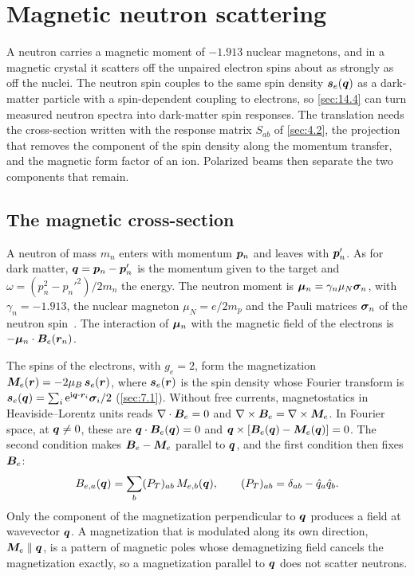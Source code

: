 \section{Magnetic neutron scattering}\label{app:C.19}

A neutron carries a magnetic moment of $-1.913$ nuclear magnetons, and in a magnetic crystal it scatters off the unpaired electron spins about as strongly as off the nuclei. The neutron spin couples to the same spin density $\bm{s}_e(\bm{q})$ as a dark-matter particle with a spin-dependent coupling to electrons, so \cref{sec:14.4} can turn measured neutron spectra into dark-matter spin responses. The translation needs the cross-section written with the response matrix $S_{ab}$ of \cref{sec:4.2}, the projection that removes the component of the spin density along the momentum transfer, and the magnetic form factor of an ion. Polarized beams then separate the two components that remain.

\subsection{The magnetic cross-section}

A neutron of mass $m_n$ enters with momentum $\bm{p}_n$ and leaves with $\bm{p}'_n$. As for dark matter, $\bm{q} = \bm{p}_n - \bm{p}'_n$ is the momentum given to the target and $\omega = (p_n^2 - p_n'^2)/2m_n$ the energy. The neutron moment is $\bm{\mu}_n = \gamma_n\mu_N\bm{\sigma}_n$, with $\gamma_n = -1.913$, the nuclear magneton $\mu_N = e/2m_p$ and the Pauli matrices $\bm{\sigma}_n$ of the neutron spin~\cite[Chap.~7]{squires2012introduction}. The interaction of $\bm{\mu}_n$ with the magnetic field of the electrons is $-\bm{\mu}_n\cdot\bm{B}_e(\bm{r}_n)$.

The spins of the electrons, with $g_e = 2$, form the magnetization $\bm{M}_e(\bm{r}) = -2\mu_B\,\bm{s}_e(\bm{r})$, where $\bm{s}_e(\bm{r})$ is the spin density whose Fourier transform is $\bm{s}_e(\bm{q}) = \sum_i\mathrm{e}^{\mathrm{i}\bm{q}\cdot\bm{r}_i}\bm{\sigma}_i/2$ (\cref{sec:7.1}). Without free currents, magnetostatics in Heaviside--Lorentz units reads $\nabla\cdot\bm{B}_e = 0$ and $\nabla\times\bm{B}_e = \nabla\times\bm{M}_e$. In Fourier space, at $\bm{q} \neq 0$, these are $\bm{q}\cdot\bm{B}_e(\bm{q}) = 0$ and $\bm{q}\times[\bm{B}_e(\bm{q}) - \bm{M}_e(\bm{q})] = 0$. The second condition makes $\bm{B}_e - \bm{M}_e$ parallel to $\bm{q}$, and the first condition then fixes $\bm{B}_e$:
\begin{equation}
  B_{e,a}(\bm{q}) = \sum_b(P_T)_{ab}\,M_{e,b}(\bm{q}), \qquad (P_T)_{ab} = \delta_{ab} - \hat q_a\hat q_b .
  \label{eq:C.19-field}
\end{equation}
Only the component of the magnetization perpendicular to $\bm{q}$ produces a field at wavevector $\bm{q}$. A magnetization that is modulated along its own direction, $\bm{M}_e \parallel \bm{q}$, is a pattern of magnetic poles whose demagnetizing field cancels the magnetization exactly, so a magnetization parallel to $\bm{q}$ does not scatter neutrons.

